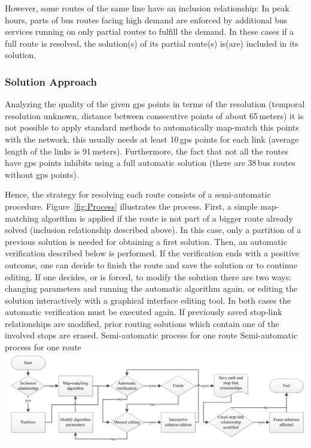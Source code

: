 However, some routes of the same line have an inclusion relationship: In peak hours, parts of bus routes facing high demand are enforced by additional bus services running on only partial routes to fulfill the demand. In these cases if a full route is resolved, the solution(s) of its partial route(s) is(are) included in its solution.

\subsubsection{Solution Approach}
Analyzing the quality of the given \gls{gps} points in terms of the resolution (temporal resolution unknown, distance between consecutive points of about 65\,meters) it is not possible to apply standard methods to automatically map-match this points with the network. this usually needs at least 10\,\gls{gps} points for each link (average length of the links is 91\,meters). Furthermore, the fact that not all the routes have \gls{gps} points inhibits using a full automatic solution (there are 38\,bus routes without \gls{gps} points).

Hence, the strategy for resolving each route consists of a semi-automatic procedure. Figure~\ref{fig:Process} illustrates the process. First, a simple map-matching algorithm is applied if the route is not part of a bigger route already solved (inclusion relationship described above). In this case, only a partition of a previous solution is needed for obtaining a first solution. Then, an automatic verification described below is performed. If the verification ends with a positive outcome, one can decide to finish the route and save the solution or to continue editing. If one decides, or is forced, to modify the solution there are two ways: changing parameters and running the automatic algorithm again, or editing the solution interactively with a graphical interface editing tool. In both cases the automatic verification must be executed again. If previously saved stop-link relationships are modified, prior routing solutions which contain one of the involved stops are erased.
%
\createfigure
{Semi-automatic process for one route}
{Semi-automatic process for one route}
{\label{fig:Process}}
{\includegraphics[width=1.0\textwidth]{extending/figures/semiAuto/Process.png}}
{}


